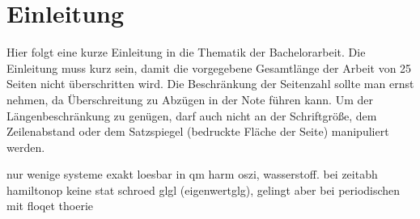 \chapter{Einleitung}
Hier folgt eine kurze Einleitung in die Thematik der Bachelorarbeit.
Die Einleitung muss kurz sein, damit die vorgegebene Gesamtlänge der
Arbeit von 25 Seiten nicht überschritten wird.
Die Beschränkung der Seitenzahl sollte man ernst nehmen,
da Überschreitung zu Abzügen in der Note führen kann.
Um der Längenbeschränkung zu genügen, darf auch nicht an der Schriftgröße,
dem Zeilenabstand oder dem Satzspiegel (bedruckte Fläche der Seite) manipuliert werden.



nur wenige systeme exakt loesbar in qm harm oszi, wasserstoff. bei zeitabh hamiltonop keine stat schroed glgl  (eigenwertglg), gelingt aber bei periodischen mit floqet thoerie
